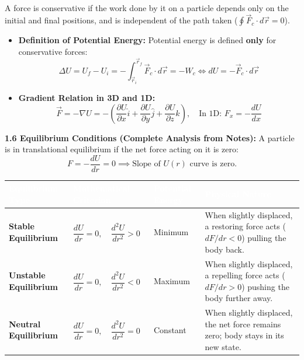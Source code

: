 \documentclass[11pt,a4paper]{article}
\begin{document}
\vspace{5pt}
\noindent{\large\textbf{\textsf{\textcolor{primaryDark}{1.5 Conservative Forces and Potential Energy}}}}\\[3pt]
A force is conservative if the work done by it on a particle depends only on the initial and final positions, and is independent of the path taken ($\oint \vec{F}_c \cdot d\vec{r} = 0$).
\begin{itemize}[leftmargin=14pt,itemsep=2pt]
  \item \textbf{Definition of Potential Energy:} Potential energy is defined \textbf{only} for conservative forces:
  \[
    \Delta U = U_f - U_i = -\int_{\vec{r}_i}^{\vec{r}_f} \vec{F}_c \cdot d\vec{r} = -W_c \iff dU = -\vec{F}_c \cdot d\vec{r}
  \]
  \item \textbf{Gradient Relation in 3D and 1D:}
  \[
    \vec{F} = -\nabla U = -\left(\frac{\partial U}{\partial x}\hat{i} + \frac{\partial U}{\partial y}\hat{j} + \frac{\partial U}{\partial z}\hat{k}\right), \quad \text{In 1D: } F_x = -\frac{dU}{dx}
  \]
\end{itemize}

\begin{tcolorbox}[formulacard]
  \textbf{\textcolor{primaryDark}{1.6 Equilibrium Conditions (Complete Analysis from Notes):}}
  A particle is in translational equilibrium if the net force acting on it is zero:
  \[
    F = -\frac{dU}{dr} = 0 \implies \text{Slope of } U(r) \text{ curve is zero.}
  \]
  \begin{center}
  \renewcommand{\arraystretch}{1.25}
  \small
  \begin{tabularx}{\linewidth}{|>{\raggedright\arraybackslash}m{2.8cm}|>{\centering\arraybackslash}m{3.2cm}|>{\centering\arraybackslash}m{2.5cm}|>{\raggedright\arraybackslash}X|}
  \hline
  \rowcolor{tableDarkHeader}
  \textcolor{white}{\textbf{Equilibrium Type}} & \textcolor{white}{\textbf{Mathematical Criterion}} & \textcolor{white}{\textbf{Potential Energy}} & \textcolor{white}{\textbf{Physical Nature}} \\
  \hline
  \rowcolor{white}
  \textbf{Stable Equilibrium} & $\dfrac{dU}{dr} = 0, \quad \dfrac{d^2 U}{dr^2} > 0$ & Minimum & When slightly displaced, a restoring force acts ($dF/dr < 0$) pulling the body back. \\
  \hline
  \rowcolor{tableStripe}
  \textbf{Unstable Equilibrium} & $\dfrac{dU}{dr} = 0, \quad \dfrac{d^2 U}{dr^2} < 0$ & Maximum & When slightly displaced, a repelling force acts ($dF/dr > 0$) pushing the body further away. \\
  \hline
  \rowcolor{white}
  \textbf{Neutral Equilibrium} & $\dfrac{dU}{dr} = 0, \quad \dfrac{d^2 U}{dr^2} = 0$ & Constant & When slightly displaced, the net force remains zero; body stays in its new state. \\
  \hline
  \end{tabularx}
  \end{center}
\end{tcolorbox}
\end{document}
